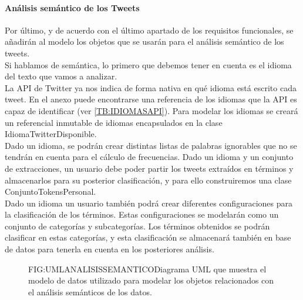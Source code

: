 \paragraph{Análisis semántico de los Tweets}
Por último, y de acuerdo con el último apartado de los requisitos funcionales, se añadirán al modelo los objetos que se usarán para el análisis semántico de los tweets. \\
Si hablamos de semántica, lo primero que debemos tener en cuenta es el idioma del texto que vamos a analizar. \\La API de Twitter ya nos indica de forma nativa en qué idioma está escrito cada tweet. En el anexo puede encontrarse una referencia de los idiomas que la API es capaz de identificar (ver \ref{TB:IDIOMASAPI}). Para modelar los idiomas se creará un referencial inmutable de idiomas encapsulados en la clase IdiomaTwitterDisponible.\\
Dado un idioma, se podrán crear distintas listas de palabras ignorables que no se tendrán en cuenta para el cálculo de frecuencias.
Dado un idioma y un conjunto de extracciones, un usuario debe poder partir los tweets extraídos en términos y almacenarlos para su posterior clasificación, y para ello construiremos una clase ConjuntoTokensPersonal.\\
Dado un idioma un usuario también podrá crear diferentes configuraciones para la clasificación de los términos. Estas configuraciones se modelarán como un conjunto de categorías y subcategorías.
Los términos obtenidos se podrán clasificar en estas categorías, y esta clasificación se almacenará también en base de datos para tenerla en cuenta en los posteriores análisis. 
\begin{figure}[Diagrama UML Análisis Semántico]{FIG:UMLANALISISSEMANTICO}{Diagrama UML que muestra el modelo de datos utilizado para modelar los objetos relacionados con el análisis semánticos de los datos.}
\end{figure}